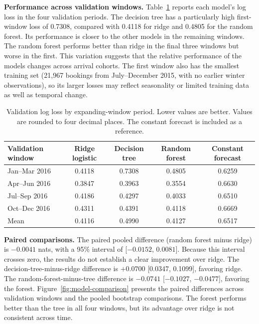 \documentclass{article}
\begin{document}
\textbf{Performance across validation windows.}
Table~\ref{tab:window-results} reports each model's log loss in
the four validation periods. The decision tree has a particularly
high first-window loss of 0.7308, compared with 0.4118 for ridge
and 0.4805 for the random forest. Its performance is closer to
the other models in the remaining windows. The random forest
performs better than ridge in the final three windows but worse
in the first. This variation suggests that the relative performance
of the models changes across arrival cohorts. The first window also
has the smallest training set (21,967 bookings from July--December
2015, with no earlier winter observations), so its larger losses may
reflect seasonality or limited training data as well as temporal
change.

\begin{table}[H]
    \caption{Validation log loss by expanding-window period.
    Lower values are better. Values are rounded to four decimal
    places. The constant forecast is included as a reference.}
    \label{tab:window-results}
    \centering
    \small
    \begin{tabular}{lcccc}
        \toprule
        Validation window & Ridge logistic & Decision tree &
        Random forest & Constant forecast \\
        \midrule
        Jan--Mar 2016 & 0.4118 & 0.7308 & 0.4805 & 0.6259 \\
        Apr--Jun 2016 & 0.3847 & 0.3963 & 0.3554 & 0.6630 \\
        Jul--Sep 2016 & 0.4186 & 0.4297 & 0.4033 & 0.6510 \\
        Oct--Dec 2016 & 0.4311 & 0.4391 & 0.4118 & 0.6669 \\
        \midrule
        Mean & 0.4116 & 0.4990 & 0.4127 & 0.6517 \\
        \bottomrule
    \end{tabular}
\end{table}

\textbf{Paired comparisons.}
The paired pooled difference (random forest minus ridge) is
$-0.0041$ nats, with a 95\% interval of [$-0.0152$, $0.0081$].
Because this interval crosses zero, the results do not establish a
clear improvement over ridge. The decision-tree-minus-ridge
difference is $+0.0700$ [0.0347, 0.1099], favoring ridge. The
random-forest-minus-tree difference is $-0.0741$
[$-0.1027$, $-0.0477$], favoring the forest.
Figure~\ref{fig:model-comparison} presents the paired differences
across validation windows and the pooled bootstrap comparisons. The
forest performs better than the tree in all four windows, but its
advantage over ridge is not consistent across time.
\end{document}
